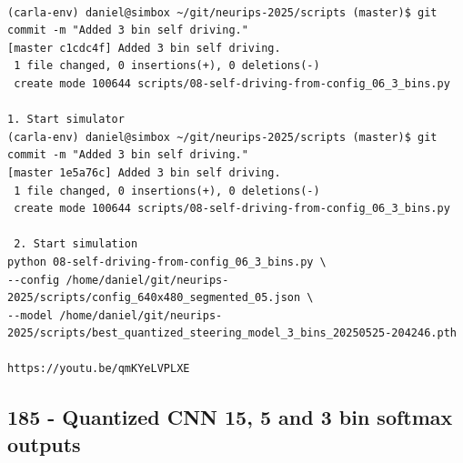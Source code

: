 \begin{verbatim}

(carla-env) daniel@simbox ~/git/neurips-2025/scripts (master)$ git commit -m "Added 3 bin self driving."
[master c1cdc4f] Added 3 bin self driving.
 1 file changed, 0 insertions(+), 0 deletions(-)
 create mode 100644 scripts/08-self-driving-from-config_06_3_bins.py

1. Start simulator
(carla-env) daniel@simbox ~/git/neurips-2025/scripts (master)$ git commit -m "Added 3 bin self driving."
[master 1e5a76c] Added 3 bin self driving.
 1 file changed, 0 insertions(+), 0 deletions(-)
 create mode 100644 scripts/08-self-driving-from-config_06_3_bins.py

 2. Start simulation
python 08-self-driving-from-config_06_3_bins.py \
--config /home/daniel/git/neurips-2025/scripts/config_640x480_segmented_05.json \
--model /home/daniel/git/neurips-2025/scripts/best_quantized_steering_model_3_bins_20250525-204246.pth

https://youtu.be/qmKYeLVPLXE

\end{verbatim}

\subsection{185 - Quantized CNN 15, 5 and 3 bin softmax outputs}
\label{app_res:185}


